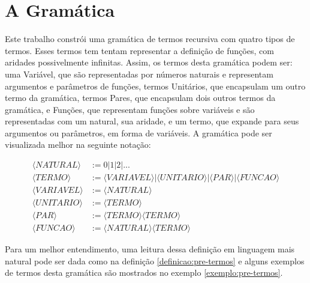 \documentclass{article}
\begin{document}
\section{A Gramática}
\label{section:a_gramatica}

Este trabalho constrói uma gramática de termos recursiva com quatro tipos de termos. Esses termos tem tentam representar a definição de funções, com aridades possivelmente infinitas. Assim, os termos desta gramática podem ser: uma Variável, que são representadas por números naturais e representam argumentos e parâmetros de funções, termos Unitários, que encapsulam um outro termo da gramática, termos Pares, que encapsulam dois outros termos da gramática, e Funções, que representam funções sobre variáveis e são representadas com um natural, sua aridade, e um termo, que expande para seus argumentos ou parâmetros, em forma de variáveis. A gramática pode ser visualizada melhor na seguinte notação:

\begin{equation}
	\begin{split}
		\langle NATURAL \rangle  & := 0 | 1 | 2 | ... \\
		\langle TERMO \rangle    & :=
			\langle VARIAVEL \rangle |
			\langle UNITARIO \rangle |
			\langle PAR \rangle |
			\langle FUNCAO \rangle \\
		\langle VARIAVEL \rangle & := \langle NATURAL \rangle \\
		\langle UNITARIO \rangle & := \langle TERMO \rangle \\
		\langle PAR \rangle      & := \langle TERMO \rangle \langle TERMO \rangle \\
		\langle FUNCAO \rangle   & := \langle NATURAL \rangle \langle TERMO \rangle
	\end{split}
\end{equation}

Para um melhor entendimento, uma leitura dessa definição em linguagem mais natural pode ser dada como na definição \ref{definicao:pre-termos} e alguns exemplos de termos desta gramática são mostrados no exemplo \ref{exemplo:pre-termos}.
\end{document}
